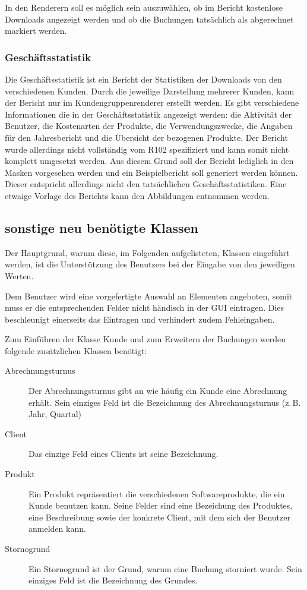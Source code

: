 In den Renderern soll es möglich sein auszuwählen, ob im Bericht kostenlose Downloads angezeigt werden und ob die Buchungen tatsächlich als abgerechnet markiert werden.

\subsubsection{Geschäftsstatistik}
Die Geschäftsstatistik ist ein Bericht der Statistiken der Downloads von den verschiedenen Kunden.
Durch die jeweilige Darstellung mehrerer Kunden, kann der Bericht nur im Kundengruppenrenderer erstellt werden.
Es gibt verschiedene Informationen die in der Geschäftsstatistik angezeigt werden: die Aktivität der Benutzer, die Kostenarten der Produkte, die Verwendungszwecke, die Angaben für den Jahresbericht und die Übersicht der bezogenen Produkte.
Der Bericht wurde allerdings nicht vollständig vom R102 spezifiziert und kann somit nicht komplett umgesetzt werden.
Aus diesem Grund soll der Bericht lediglich in den Masken vorgesehen werden und ein Beispielbericht soll generiert werden können. Dieser entspricht allerdings nicht den tatsächlichen Geschäftsstatistiken.
Eine etwaige Vorlage des Berichts kann den Abbildungen  entnommen werden.
 
\subsection{sonstige neu benötigte Klassen} \label{subsec:neue_klassen}
Der Hauptgrund, warum diese, im Folgenden aufgelisteten, Klassen eingeführt werden, ist die Unterstützung des Benutzers bei der Eingabe von den jeweiligen Werten.

Dem Benutzer wird eine vorgefertigte Auswahl an Elementen angeboten, somit muss er die entsprechenden Felder nicht händisch in der GUI eintragen.
Dies beschleunigt einerseits das Eintragen und verhindert zudem Fehleingaben. 

Zum Einführen der Klasse Kunde und zum Erweitern der Buchungen werden folgende zusätzlichen Klassen benötigt:
\begin{description}
\item[Abrechnungsturnus] Der Abrechnungsturnus gibt an wie häufig ein Kunde eine Abrechnung erhält. Sein einziges Feld ist die Bezeichnung des Abrechnungsturnus (z.\,B. Jahr, Quartal)
\item[Client] Das einzige Feld eines Clients ist seine Bezeichnung.
\item[Produkt] Ein Produkt repräsentiert die verschiedenen Softwareprodukte, die ein Kunde benutzen kann. Seine Felder sind eine Bezeichung des Produktes, eine Beschreibung sowie der konkrete Client, mit dem sich der Benutzer anmelden kann.
\item[Stornogrund] Ein Stornogrund ist der Grund, warum eine Buchung storniert wurde. Sein einziges Feld ist die Bezeichnung des Grundes.
\end{description}

